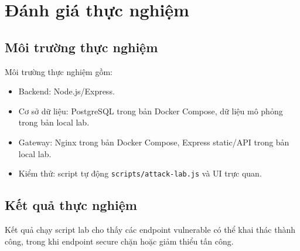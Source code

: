 \documentclass[14pt,a4paper]{extreport}
\begin{document}
\chapter{Đánh giá thực nghiệm}

\section{Môi trường thực nghiệm}
Môi trường thực nghiệm gồm:
\begin{itemize}
  \item Backend: Node.js/Express.
  \item Cơ sở dữ liệu: PostgreSQL trong bản Docker Compose, dữ liệu mô phỏng trong bản local lab.
  \item Gateway: Nginx trong bản Docker Compose, Express static/API trong bản local lab.
  \item Kiểm thử: script tự động \texttt{scripts/attack-lab.js} và UI trực quan.
\end{itemize}

\section{Kết quả thực nghiệm}
Kết quả chạy script lab cho thấy các endpoint vulnerable có thể khai thác thành công, trong khi endpoint secure chặn hoặc giảm thiểu tấn công.
\end{document}
